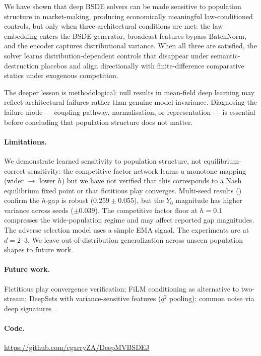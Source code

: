 \documentclass[11pt,a4paper]{article}
\begin{document}
We have shown that deep BSDE solvers can be made sensitive to population structure in market-making, producing economically meaningful law-conditioned controls, but only when three architectural conditions are met: the law embedding enters the BSDE generator, broadcast features bypass BatchNorm, and the encoder captures distributional variance. When all three are satisfied, the solver learns distribution-dependent controls that disappear under semantic-destruction placebos and align directionally with finite-difference comparative statics under exogenous competition.

The deeper lesson is methodological: null results in mean-field deep learning may reflect architectural failures rather than genuine model invariance. Diagnosing the failure mode --- coupling pathway, normalisation, or representation --- is essential before concluding that population structure does not matter.

\paragraph{Limitations.} We demonstrate learned sensitivity to population structure, not equilibrium-correct sensitivity: the competitive factor network learns a monotone mapping (wider $\to$ lower $h$) but we have not verified that this corresponds to a Nash equilibrium fixed point or that fictitious play converges. Multi-seed results () confirm the $h$-gap is robust ($0.259 \pm 0.055$), but the $Y_0$ magnitude has higher variance across seeds ($\pm 0.039$). The competitive factor floor at $h = 0.1$ compresses the wide-population regime and may affect reported gap magnitudes. The adverse selection model uses a simple EMA signal. The experiments are at $d = 2$--$3$. We leave out-of-distribution generalization across unseen population shapes to future work.

\paragraph{Future work.} Fictitious play convergence verification; FiLM conditioning as alternative to two-stream; DeepSets with variance-sensitive features ($q^2$ pooling); common noise via deep signatures~\cite{hu2025deep}.

\paragraph{Code.} \url{https://github.com/cgarryZA/DeepMVBSDEJ}
\end{document}

